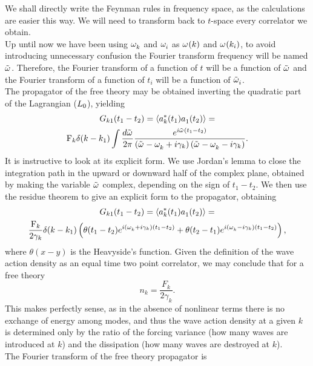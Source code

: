 We shall directly write the Feynman rules in frequency space, as the calculations are easier this way. We will need to transform back to $t$-space every 
correlator we obtain.\\
Up until now we have been using $\omega^{}_k$ and $\omega^{}_i$ as $\omega^{}(k)$ and $\omega^{}(k_i)$, to avoid introducing unnecessary confusion the 
Fourier transform frequency will be named $\tilde{\omega}^{}$. Therefore, the Fourier transform of a function of $t$ will be a function of $\tilde{\omega}^{}$ and the Fourier 
transform of a function of $t_i$ will be a function of $\tilde{\omega}^{}_i$. \\
The propagator of the free theory may be obtained inverting the quadratic part of the Lagrangian ($L_0$), yielding 
\begin{multline}
    G_{k1}(t_1 - t_2) = \langle a_k^*(t_1)a_1^{}(t_2)\rangle = \\
    \mathrm{F}_k \delta(k-k_1)\int \frac{d \tilde{\omega}^{}}{2\pi}\frac{e^{i\tilde{\omega}^{}(t_1 - t_2)}}
    {\left(\tilde{\omega}^{} -\omega^{}_k + i\gamma_k \right)\left(\tilde{\omega}^{} -\omega^{}_k-i \gamma_k\right)}. 
    \label{propspace}
\end{multline}
It is instructive to look at its explicit form. We use Jordan's lemma to close the integration path in the upward or downward half of the complex plane, obtained by 
making the variable $\tilde{\omega}^{}$ complex, depending on the sign of $t_1 - t_2$. We then use the residue theorem to give an explicit form to the propagator, obtaining
\begin{multline}
    G_{k1}(t_1 - t_2) = \langle a_k^*(t_1)a_1^{}(t_2)\rangle = \\
    \frac{\mathrm{F}_k}{2\gamma_k}\delta(k-k_1)\left(\theta(t_1-t_2)e^{i(\omega^{}_k + i\gamma_k)(t_1 - t_2)}
    +\theta(t_2-t_1)e^{i(\omega^{}_k - i\gamma_k)(t_1 - t_2)}\right),
\end{multline}  
where $\theta(x-y)$ is the Heavyside's function. Given the definition of the wave action density as an equal time two point correlator, we may conclude that for a 
free theory
\begin{equation}
    n_k = \frac{F_k}{2\gamma_k}.
    \label{freenwav}
\end{equation}
This makes perfectly sense, as in the absence of nonlinear terms there is no exchange of energy among modes, and thus the wave action density at a given $k$ is determined
only by the ratio of the forcing variance (how many waves are introduced at $k$) and the dissipation (how many waves are destroyed at $k$). \\
The Fourier transform of the free theory propagator is

